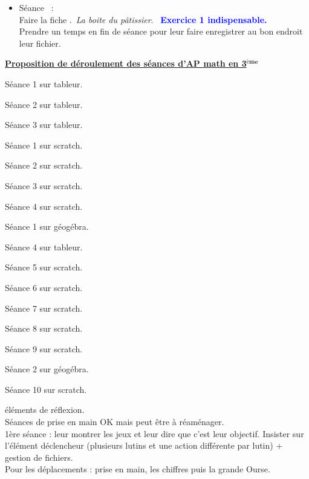 \documentclass[12pt,a4paper]{article} %
\newcounter{num}
\newcommand{\seance}{\stepcounter{num} Séance \thenum \, : \\}
\newcounter{fiche}
\newcommand{\fiche}{\stepcounter{fiche} Faire la fiche \thefiche. \,}
\begin{document}
\begin{itemize}
\begin{itemize}
\vspace{3pt}
\item[\textbullet]
\seance
\fiche \textit{La boite du pâtissier}. \, \textcolor{blue}{\textbf{Exercice 1 indispensable.}}\\
Prendre un temps en fin de séance pour leur faire enregistrer au bon endroit leur fichier.
\end{itemize}
\end{itemize}
\vfill
\begin{Large}
\textbf{\underline{Proposition de déroulement des séances d'AP math en 3$^\textbf{ème}$}}
\end{Large} \vspace{6pt}
\begin{enumerate}
\begin{minipage}{0.5\linewidth}
\item
Séance 1 sur tableur.
\item
Séance 2 sur tableur.
\item
Séance 3 sur tableur.
\item
Séance 1 sur scratch.
\item
Séance 2 sur scratch.
\item
Séance 3 sur scratch.
\item
Séance 4 sur scratch.
\item
Séance 1 sur géogébra.
\end{minipage}
\begin{minipage}{0.5\linewidth}
\item
Séance 4 sur tableur.
\item
Séance 5 sur scratch.
\item
Séance 6 sur scratch.
\item
Séance 7 sur scratch.
\item
Séance 8 sur scratch.
\item
Séance 9 sur scratch.
\item
Séance 2 sur géogébra.
\item
Séance 10 sur scratch.
\end{minipage}
\end{enumerate}
\newpage
éléments de réflexion. \\
Séances de prise en main OK mais peut être à réaménager. \\
1ère séance : leur montrer les jeux et leur dire que c'est leur objectif. Insister sur l'élément déclencheur (plusieurs lutins et une action différente par lutin) + gestion de fichiers. \\
Pour les déplacements : prise en main, les chiffres puis la grande Ourse. \\
\end{document}
